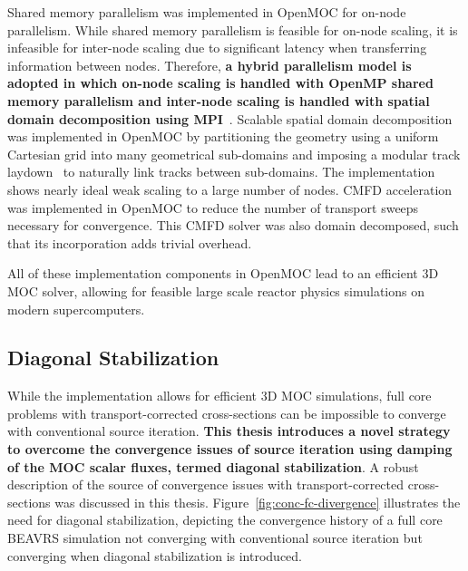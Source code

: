 Shared memory parallelism was implemented in OpenMOC for on-node parallelism. While shared memory parallelism is feasible for on-node scaling, it is infeasible for inter-node scaling due to significant latency when transferring information between nodes. Therefore, \textbf{a hybrid parallelism model is adopted in which on-node scaling is handled with OpenMP shared memory parallelism and inter-node scaling is handled with spatial domain decomposition using MPI}~\cite{mpi}. Scalable spatial domain decomposition was implemented in OpenMOC by partitioning the geometry using a uniform Cartesian grid into many geometrical sub-domains and imposing a modular track laydown~\cite{liu_mrt} to naturally link tracks between sub-domains. The implementation shows nearly ideal weak scaling to a large number of nodes. \ac{CMFD} acceleration was implemented in OpenMOC to reduce the number of transport sweeps necessary for convergence. This \ac{CMFD} solver was also domain decomposed, such that its incorporation adds trivial overhead.

All of these implementation components in OpenMOC lead to an efficient 3D \ac{MOC} solver, allowing for feasible large scale reactor physics simulations on modern supercomputers.

\subsection{Diagonal Stabilization}
\label{sec:sub:diag-stab}

While the implementation allows for efficient 3D \ac{MOC} simulations, full core problems with transport-corrected cross-sections can be impossible to converge with conventional source iteration. \textbf{This thesis introduces a novel strategy to overcome the convergence issues of source iteration using damping of the MOC scalar fluxes, termed diagonal stabilization}. A robust description of the source of convergence issues with transport-corrected cross-sections was discussed in this thesis. Figure~\ref{fig:conc-fc-divergence} illustrates the need for diagonal stabilization, depicting the convergence history of a full core BEAVRS simulation not converging with conventional source iteration but converging when diagonal stabilization is introduced.

